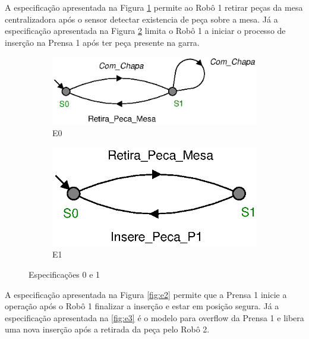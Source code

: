 A especificação apresentada na Figura \ref{fig:e0} permite ao Robô 1 retirar peças da mesa centralizadora após o sensor detectar existencia de peça sobre a mesa.
Já a especificação apresentada na Figura \ref{fig:e1} limita o Robô 1 a iniciar o processo de inserção na Prensa 1 após ter peça presente na garra.

\begin{figure}[H]%
  \centering
  \begin{subfigure}[b]{0.45\textwidth}
      \centering
      \includegraphics[width=\textwidth]{imagens/E0.eps}
      \caption{E0}
      \label{fig:e0}
  \end{subfigure}
  \hfill
  \begin{subfigure}[b]{0.45\textwidth}
      \centering
      \includegraphics[width=\textwidth]{imagens/E1.eps}
      \caption{E1}
      \label{fig:e1}
  \end{subfigure}
  \caption{Especificações 0 e 1}
  \label{fig:e01}
\end{figure}

A especificação apresentada na Figura \ref{fig:e2} permite que a Prensa 1 inicie a operação após o Robô 1 finalizar a inserção e estar em posição segura.
Já a especificação apresentada na \ref{fig:e3} é o modelo para overflow da Prensa 1 e libera uma nova inserção após a retirada da peça pelo Robô 2.

